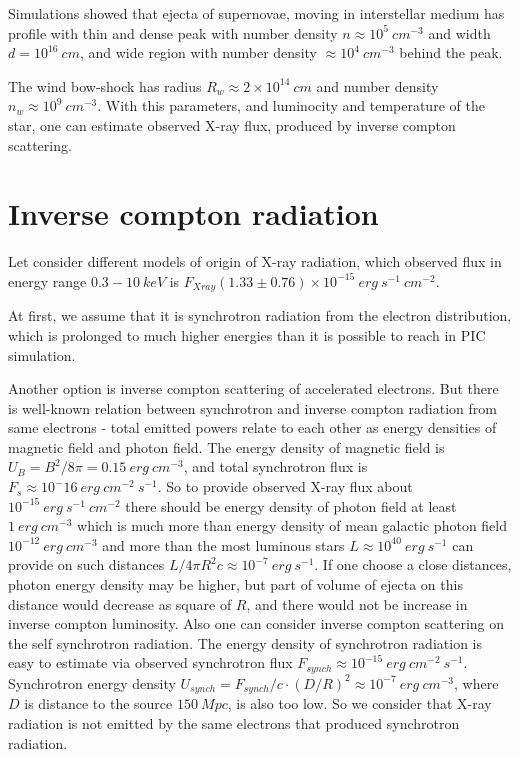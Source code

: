 \documentclass{article}
\begin{document}
	Simulations showed that ejecta of supernovae, moving in interstellar medium has profile with thin and dense peak with number density $n \approx 10^5~cm^{-3}$ and width $d = 10^{16}~cm$, and wide region with number density $\approx 10^4~cm^{-3}$ behind the peak.
	
	The wind bow-shock has radius $R_w \approx 2\times10^{14}~cm$ and number density $n_w \approx 10^9~cm^{-3}$. With this parameters, and luminocity and temperature of the star, one can estimate observed X-ray flux, produced by inverse compton scattering.
	
	\section{Inverse compton radiation}\label{compton}
	
	Let consider different models of origin of X-ray radiation, which observed flux in energy range $0.3 - 10~keV$ is $F_{Xray} (1.33 \pm 0.76) \times 10^{-15}~erg~s^{-1}~cm^{-2}$.
	
	At first, we assume that it is synchrotron radiation from the electron distribution, which is prolonged to much higher energies than it is possible to reach in PIC simulation. 
	
	Another option is inverse compton scattering of accelerated electrons. But there is well-known relation between synchrotron and  inverse compton radiation from same electrons \cite{Ghisellini} - total emitted powers relate to each other as energy densities of magnetic field and photon field. The energy density of magnetic field is $U_B = B^2/8\pi = 0.15 ~erg~cm^{-3}$, and total synchrotron flux is $F_s \approx 10^-16~erg~cm^{-2}~s^{-1}$. So to provide observed X-ray flux about $10^{-15}~erg~s^{-1}~cm^{-2}$ there should be energy density of photon field at least $1~erg~cm^{-3}$ which is much more than energy density of mean galactic photon field $10^{-12}~erg~cm^{-3}$ \cite{Mathis1983} and more than the most luminous stars $L \approx 10^{40}~erg~s^{-1}$ can provide on such distances $L/4\pi R^2 c \approx 10^{-7}~erg~s^{-1}$. If one choose a close distances, photon energy density may be higher, but part of volume of ejecta on this distance would decrease as square of $R$, and there would not be increase in inverse compton luminosity. Also one can consider inverse compton scattering on the self synchrotron radiation. The energy density of synchrotron radiation is easy to estimate via observed synchrotron flux $F_{synch} \approx 10^{-15}~erg~cm^{-2}~s^{-1}$. Synchrotron energy density $U_{synch} = F_{synch}/c \cdot (D/R)^2 \approx 10^{-7}~erg~cm^{-3}$, where $D$ is distance to the source $150~Mpc$, is also too low. So we consider that X-ray radiation is not emitted by the same electrons that produced synchrotron radiation.
	
\end{document}
